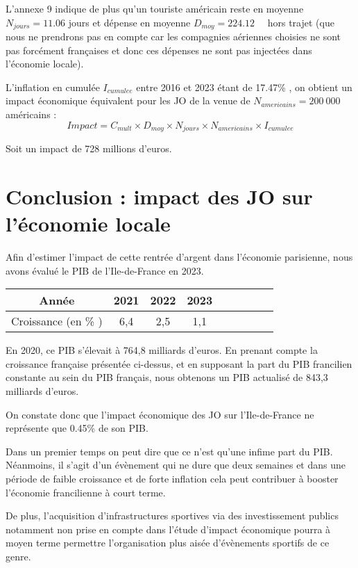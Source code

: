 \documentclass{article}
\begin{document}
  L'annexe 9 indique de plus qu'un touriste américain reste en moyenne $N_{jours} = 11.06$ jours et dépense en moyenne $D_{moy}=224.12$~\texteuro~ hors trajet (que nous ne prendrons pas en compte car les compagnies aériennes choisies ne sont pas forcément françaises et donc ces dépenses ne sont pas injectées dans l'économie locale).
  \vspace{0.5cm}

  L'inflation en cumulée $I_{cumulee}$ entre 2016 et 2023 étant de 17.47\% , on obtient un impact économique équivalent pour les JO de la venue de $N_{americains} = 200~000$ américains :
  $$ Impact = C_{mult} \times D_{moy} \times N_{jours} \times N_{americains} \times I_{cumulee}$$

  Soit un impact de 728 millions d'euros.
\section{Conclusion : impact des JO sur l'économie locale}



  Afin d'estimer l'impact de cette rentrée d'argent dans l'économie parisienne, nous avons évalué le PIB de l'Ile-de-France en 2023. 

  
  \vspace{0.5cm}
  \begin{center}
    \begin{tabular}{ | c | c | c |  c |  c |  c |  c |  c |  c | }
      \hline
      Année & 2021 & 2022 & 2023  \\ \hline
      Croissance (en \% ) & 6,4 & 2,5 & 1,1  \\ \hline
    \end{tabular}
  \end{center}
    \vspace{0.5cm}

  En 2020, ce PIB s'élevait à 764,8 milliards d'euros. En prenant compte la croissance française présentée ci-dessus, et en supposant la part du PIB francilien constante au sein du PIB français, nous obtenons un PIB actualisé de 843,3 milliards d'euros.
  \vspace{0.5cm}

  On constate donc que l'impact économique des JO sur l'Ile-de-France ne représente que 0.45\% de son PIB.
  \vspace{0.5cm}

  Dans un premier temps on peut dire que ce n'est qu'une infime part du PIB. Néanmoins, il s'agit d'un évènement qui ne dure que deux semaines et  dans une période de faible croissance et de forte inflation cela peut contribuer à booster l'économie francilienne à court terme. 
  \vspace{0.5cm}


  De plus, l'acquisition d'infrastructures sportives via des investissement publics notamment non prise en compte dans l'étude d'impact économique pourra à moyen terme permettre l'organisation plus aisée d'évènements sportifs de ce genre.
\end{document}
